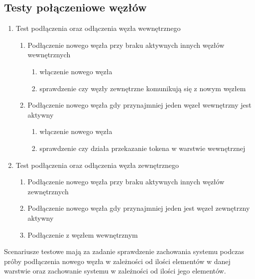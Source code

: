 \subsection[Testy połączeniowe węzłów]{Testy połączeniowe węzłów}
\begin{enumerate}
\item Test podłączenia oraz odłączenia węzła wewnętrznego
\begin{enumerate}
\item Podłączenie nowego węzła przy braku aktywnych innych węzłów wewnętrznych
	\begin{enumerate}
	\item włączenie nowego węzła
	\item sprawdzenie czy węzły zewnętrzne komunikują się z nowym węzłem
	\end{enumerate}
\item Podłączenie nowego węzła gdy przynajmniej jeden węzeł wewnętrzny jest aktywny 
	\begin{enumerate}
	\item włączenie nowego węzła
	\item sprawdzenie czy działa przekazanie tokena w warstwie wewnętrznej
	\end{enumerate}
\end{enumerate}

\item Test podłączenia oraz odłączenia węzła zewnętrznego
\begin{enumerate}
\item Podłączenie nowego węzła przy braku aktywnych innych węzłów zewnętrznych
\item Podłączenie nowego węzła gdy przynajmniej jeden jest węzeł zewnętrzny aktywny
\item Podłączenie z węzłem wewnętrznym

\end{enumerate}
\end{enumerate}

Scenariusze testowe mają za zadanie sprawdzenie zachowania systemu podczas próby podłączenia nowego węzła w zależności od ilości elementów w danej warstwie oraz zachowanie systemu w zależności od ilości jego elementów.
